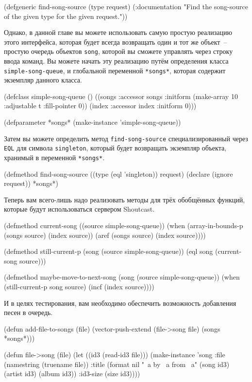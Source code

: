 \begin{myverb}
(defgeneric find-song-source (type request)
  (:documentation "Find the song-source of the given type for the given request."))
\end{myverb}

Однако, в данной главе вы можете использовать самую простую реализацию этого интерфейса,
которая будет всегда возвращать один и тот же объект~-- простую очередь объектов
\lstinline{song}, которой вы сможете управлять через строку ввода команд. Вы можете начать эту
реализацию путём определения класса \lstinline{simple-song-queue}, и глобальной переменной
\lstinline{*songs*}, которая содержит экземпляр данного класса.

\begin{myverb}
(defclass simple-song-queue ()
  ((songs :accessor songs :initform (make-array 10 :adjustable t :fill-pointer 0))
   (index :accessor index :initform 0)))

(defparameter *songs* (make-instance 'simple-song-queue))
\end{myverb}

Затем вы можете определить метод \lstinline{find-song-source} специализированный через
\lstinline{EQL} для символа \lstinline{singleton}, который будет возвращать экземпляр объекта,
хранимый в переменной \lstinline{*songs*}.

\begin{myverb}
(defmethod find-song-source ((type (eql 'singleton)) request)
  (declare (ignore request))
  *songs*)
\end{myverb}

Теперь вам всего-лишь надо реализовать методы для трёх обобщённых функций, которые будут
использоваться сервером Shoutcast.

\begin{myverb}
(defmethod current-song ((source simple-song-queue))
  (when (array-in-bounds-p (songs source) (index source))
    (aref (songs source) (index source))))

(defmethod still-current-p (song (source simple-song-queue))
  (eql song (current-song source)))

(defmethod maybe-move-to-next-song (song (source simple-song-queue))
  (when (still-current-p song source)
    (incf (index source))))
\end{myverb}

И в целях тестирования, вам необходимо обеспечить возможность добавления песен в очередь.

\begin{myverb}
(defun add-file-to-songs (file)
  (vector-push-extend (file->song file) (songs *songs*)))

(defun file->song (file)
  (let ((id3 (read-id3 file)))
    (make-instance 
     'song
     :file (namestring (truename file))
     :title (format nil "~a by ~a from ~a" (song id3) (artist id3) (album id3))
     :id3-size (size id3))))
\end{myverb}

